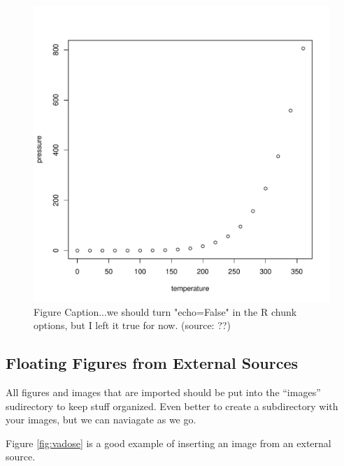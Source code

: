 \documentclass{book}\usepackage{knitr}
\begin{document}
\begin{knitrout}
\begin{kframe}
\begin{figure}
\begin{knitrout}
\color{fgcolor}\begin{kframe}
\begin{alltt}
\end{alltt}
\end{kframe}
\includegraphics[width=\maxwidth]{figure/fig:pressure-1} 

\end{knitrout}
\caption{Figure Caption...we should turn "echo=False" in the R chunk options, but I left it true for now. (source: ??)} %
\label{fig:pressure}

\end{figure}

\subsection{Floating Figures from External Sources}

All figures and images that are imported should be put into the ``images'' sudirectory to keep stuff organized. Even better to create a subdirectory with your images, but we can naviagate as we go.

Figure \ref{fig:vadose} is a good example of inserting an image from an external source.


\end{kframe}
\end{knitrout}
\end{document}
